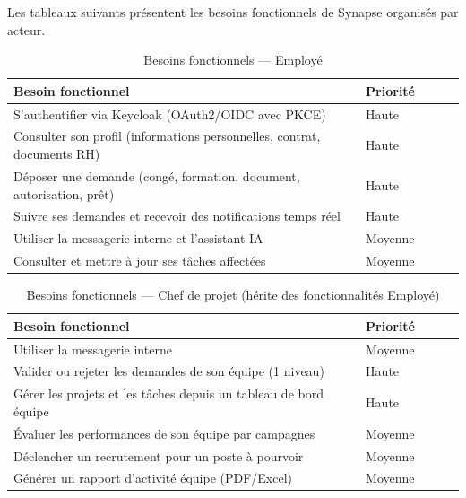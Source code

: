 Les tableaux suivants présentent les besoins fonctionnels de Synapse organisés par acteur.

\begin{table}[H]
\centering
\caption{Besoins fonctionnels — Employé}
\label{tab:bf_employe}
\begin{tabularx}{\textwidth}{VLVlV}
\hline
\textbf{Besoin fonctionnel} & \textbf{Priorité} \\
\hline
S’authentifier via Keycloak (OAuth2/OIDC avec PKCE) & Haute \\
\hline
Consulter son profil (informations personnelles, contrat, documents RH) & Haute \\
\hline
Déposer une demande (congé, formation, document, autorisation, prêt) & Haute \\
\hline
Suivre ses demandes et recevoir des notifications temps réel & Haute \\
\hline
Utiliser la messagerie interne et l’assistant IA & Moyenne \\
\hline
Consulter et mettre à jour ses tâches affectées & Moyenne \\
\hline
\end{tabularx}
\end{table}

\begin{table}[H]
\centering
\caption{Besoins fonctionnels — Chef de projet (hérite des fonctionnalités Employé)}
\label{tab:bf_chef}
\begin{tabularx}{\textwidth}{VLVlV}
\hline
\textbf{Besoin fonctionnel} & \textbf{Priorité} \\
\hline
Utiliser la messagerie interne & Moyenne \\
\hline
Valider ou rejeter les demandes de son équipe (1 niveau) & Haute \\
\hline
Gérer les projets et les tâches depuis un tableau de bord équipe & Haute \\
\hline
Évaluer les performances de son équipe par campagnes & Moyenne \\
\hline
Déclencher un recrutement pour un poste à pourvoir & Moyenne \\
\hline
Générer un rapport d’activité équipe (PDF/Excel) & Moyenne \\
\hline
\end{tabularx}
\end{table}

